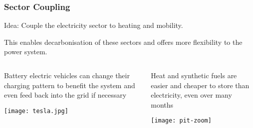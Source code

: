 \documentclass[10pt,aspectratio=169,dvipsnames]{beamer}
\begin{document}
\begin{frame}[fragile]
  \frametitle{Sector Coupling}

  \alert{Idea}: Couple the electricity sector to heating and mobility.

  This enables decarbonisation of these sectors \alert{and} offers more flexibility to the power system.

  \vspace{0.2cm}

  \begin{columns}[T]
\begin{column}{6cm}
  \alert{Battery electric vehicles} can change their charging pattern to benefit the
  system and even feed back into the grid if necessary

  \texttt{[image: tesla.jpg]}
\end{column}
\begin{column}{6cm}
  \alert{Heat} and \alert{synthetic fuels} are easier and cheaper to store than electricity, even over many months

  \vspace{0.5cm}

        \texttt{[image: pit-zoom]}
\end{column}
\end{columns}


\end{frame}
\end{document}
